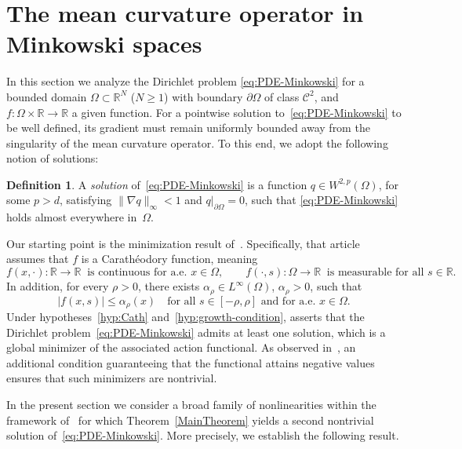 \documentclass{article}
\theoremstyle{definition}
\newtheorem{definition}{Definition}[section]
\begin{document}
\section{The mean curvature operator in Minkowski spaces}
\label{Section:Minkowski}

In this section we analyze the Dirichlet problem \eqref{eq:PDE-Minkowski} for a bounded domain
 $\Omega\subset\mathbb{R}^N$ ($N\geq 1$)  with boundary
$\partial\Omega$ of class $\mathcal{C}^2$, and $f\colon\Omega\times\mathbb{R}\to\mathbb{R}$ a given function. For a pointwise solution to~\eqref{eq:PDE-Minkowski} to be well defined, its
gradient must remain uniformly bounded away from the singularity of the mean
curvature operator.
To this end, we adopt the following notion of solutions:

\begin{definition}\label{def:sol-PDE}
A \emph{solution} of~\eqref{eq:PDE-Minkowski} is a function
$q \in W^{2,p}(\Omega)$, for some $p > d$, satisfying
$\|\nabla q\|_{\infty} < 1$ and $q|_{\partial\Omega}=0$, such that
\eqref{eq:PDE-Minkowski} holds almost everywhere in~$\Omega$.
\end{definition}

Our starting point is the minimization result of~\cite{BerJebMaw}.
Specifically, that article assumes that $f$ is a Carath\'{e}odory function,
meaning
\begin{equation}\label{hyp:Cath}
  f(x,\cdot)\colon\mathbb{R}\to\mathbb{R}
    \ \text{ is continuous for a.e.\ } x\in\Omega,
  \qquad
  f(\cdot,s)\colon\Omega\to\mathbb{R}
    \ \text{ is measurable for all } s\in\mathbb{R}.
\end{equation}
In addition, for every $\rho>0$, there exists $\alpha_\rho\in L^\infty(\Omega)$,
$\alpha_\rho > 0$, such that
\begin{equation}\label{hyp:growth-condition}
  |f(x,s)|\leq \alpha_\rho(x)
  \quad\text{for all } s\in[-\rho,\rho]
  \text{ and for a.e. } x\in\Omega.
\end{equation}
Under hypotheses~\eqref{hyp:Cath} and~\eqref{hyp:growth-condition},
\cite[Theorem~2.1]{BerJebMaw} asserts that the Dirichlet
problem~\eqref{eq:PDE-Minkowski} admits at least one solution, which is a
global minimizer of the associated action functional.
As observed in~\cite[Theorem~3.1]{BerJebMaw}, an additional condition guaranteeing that the
functional attains negative values ensures that such minimizers are nontrivial.

In the present section we consider a broad family of nonlinearities within the
framework of~\cite{BerJebMaw} for which Theorem~\ref{MainTheorem} yields a
second nontrivial solution of~\eqref{eq:PDE-Minkowski}.
More precisely, we establish the following result.
\end{document}
